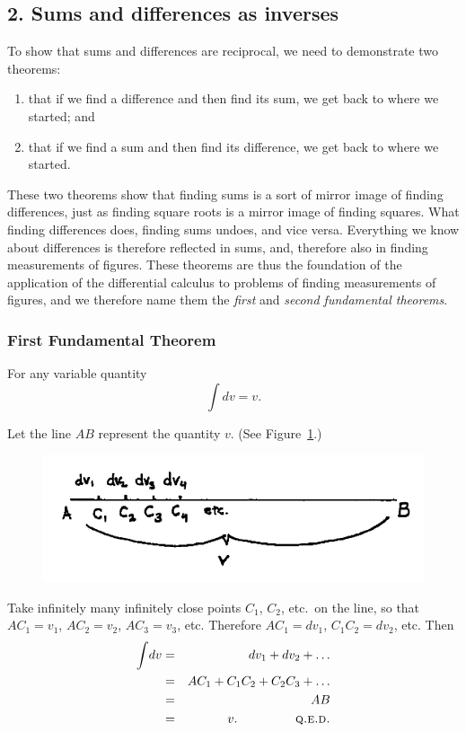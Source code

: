 \documentclass[polutonikogreek,english,twoside,openright]{article}
\begin{document}
\subsection*{2. Sums and differences as inverses}

To show that sums and differences are reciprocal, we need to demonstrate two theorems:
\begin{enumerate}
\itemsep0em
\item that if we find a difference and then find its sum, we get back
  to where we started; and
\item that if we find a sum and then find its difference, we get back
  to where we started.
\end{enumerate}
These two theorems show that finding sums is a sort of mirror image of
finding differences, just as finding square roots is a mirror image of
finding squares.  What finding differences does, finding sums undoes,
and vice versa.  Everything we know about differences is therefore
reflected in sums, and, therefore also in finding measurements of
figures.  These theorems are thus the foundation of the application of
the differential calculus to problems of finding measurements of
figures, and we therefore name them the {\em first} and {\em second
  fundamental theorems}.

\subsubsection*{First Fundamental Theorem}
\label{fund1} For any variable quantity
$$\int\!dv = v.$$

Let the line $AB$ represent the quantity $v$. (See Figure~\ref{ffundfig}.)
\begin{figure}[htp]
\begin{center}
\includegraphics[width=.75\textwidth]{fig/Figure37}
\caption{}
\label{ffundfig}
\vspace{-10pt}
\end{center}
\end{figure} Take infinitely many infinitely close points $C_1$,
$C_2$, etc.\ on the line, so that $AC_1 = v_1$, $AC_2 =v_2$,
$AC_3 =v_3$, etc.  Therefore $AC_1 =dv_1$, $C_1C_2 = dv_2$, etc. Then
\begin{eqnarray*}
  \int\!dv & = & dv_1 + dv_2 + \ldots\\
           & = & AC_1 + C_1C_2 + C_2C_3 +\ldots \\
           & = & AB\\
           & = & v. \mbox{\hspace{10ex}  \textsc{q.e.d.}}
\end{eqnarray*}
\end{document}
